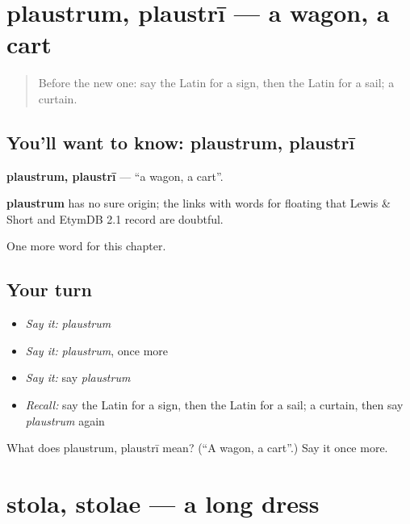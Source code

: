\section[plaustrum, plaustrī]{plaustrum, plaustrī — a wagon, a cart}

\label{lesson:LA-C125-plaustrum}



\begin{quote}
Before the new one: say the Latin for a sign, then the Latin for a sail; a curtain.
\end{quote}

\subsection*{You'll want to know: plaustrum, plaustrī}
\textbf{plaustrum, plaustrī} — \textquotedblleft{}a wagon, a cart\textquotedblright{}.

\begin{cousinweb}
\textbf{plaustrum} has no sure origin; the links with words for floating that Lewis \& Short and EtymDB 2.1 record are doubtful.
\end{cousinweb}

\begin{grammarlens}[title={What you've built}]
One more word for this chapter.
\end{grammarlens}

\subsection*{Your turn}
\begin{itemize}
\raggedright
  \item \emph{Say it:} \emph{plaustrum}
  \item \emph{Say it:} \emph{plaustrum}, once more
  \item \emph{Say it:} say \emph{plaustrum}
  \item \emph{Recall:} say the Latin for a sign, then the Latin for a sail; a curtain, then say \emph{plaustrum} again
\end{itemize}

\begin{tcolorbox}[breakable,colback=teal!4,colframe=teal!35!black,title={Before you move on}]
What does plaustrum, plaustrī mean? (\textquotedblleft{}A wagon, a cart\textquotedblright{}.) Say it once more.
\end{tcolorbox}
\section[stola, stolae]{stola, stolae — a long dress}

